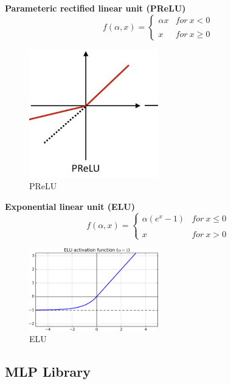 \documentclass[letterpaper]{article}
\begin{document}
\textbf{Parameteric rectified linear unit (PReLU)\cite{nano5}}
$$f(\alpha ,x)=\left\{\begin{matrix}
\alpha x & for\ x< 0\\ 
 & \\ 
x & for\ x\geq 0 
\end{matrix}\right.$$
\begin{figure}[H]
\centering
\includegraphics[width=0.5\textwidth, height=0.35\textwidth]{PRELU.jpg}
\caption{\label{fig:frog}PReLU}
\end{figure}
\textbf{Exponential linear unit (ELU)\cite{nano6}}
$$f(\alpha ,x)=\left\{\begin{matrix}
\alpha (e^{x}-1) & for\ x\leq  0\\ 
 & \\ 
x & for\ x>  0 
\end{matrix}\right.$$
\begin{figure}[H]
\centering
\includegraphics[width=0.5\textwidth]{ELU.png}
\caption{\label{fig:frog}ELU}
\end{figure}
\subsection{MLP Library}
\end{document}
